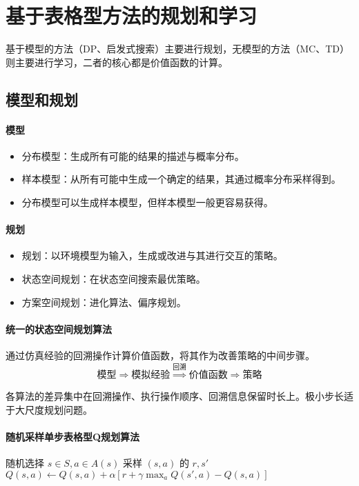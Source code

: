 \documentclass[
12pt, %
a4paper, 
oneside, %
headinclude,footinclude, %
]{scrartcl}
\begin{document}
\section{基于表格型方法的规划和学习}
基于模型的方法（DP、启发式搜索）主要进行规划，无模型的方法（MC、TD）则主要进行学习，二者的核心都是价值函数的计算。
\subsection{模型和规划}
\paragraph{模型}
\begin{itemize}
\item 分布模型：生成所有可能的结果的描述与概率分布。
\item 样本模型：从所有可能中生成一个确定的结果，其通过概率分布采样得到。
\item 分布模型可以生成样本模型，但样本模型一般更容易获得。
\end{itemize}
\paragraph{规划}
\begin{itemize}
\item 规划：以环境模型为输入，生成或改进与其进行交互的策略。
\item 状态空间规划：在状态空间搜索最优策略。
\item 方案空间规划：进化算法、偏序规划。
\end{itemize}
\paragraph{统一的状态空间规划算法}
通过仿真经验的回溯操作计算价值函数，将其作为改善策略的中间步骤。
$$ \text{模型} \Longrightarrow \text{模拟经验} \overset{\text{回溯}}{\Longrightarrow} \text{价值函数} \Longrightarrow \text{策略} $$

各算法的差异集中在回溯操作、执行操作顺序、回溯信息保留时长上。极小步长适于大尺度规划问题。
\paragraph{随机采样单步表格型Q规划算法}
\begin{myalgorithm}[随机采样单步表格型Q规划算法]
\Loop
    \State 随机选择 $s \in S, a \in A(s)$
    \State 采样 $(s, a)$ 的 $r,s'$
    \State $Q(s, a) \gets Q(s, a) + \alpha[r + \gamma \max_a Q(s', a) - Q(s, a)]$ 
\EndLoop
\end{myalgorithm}
\end{document}
